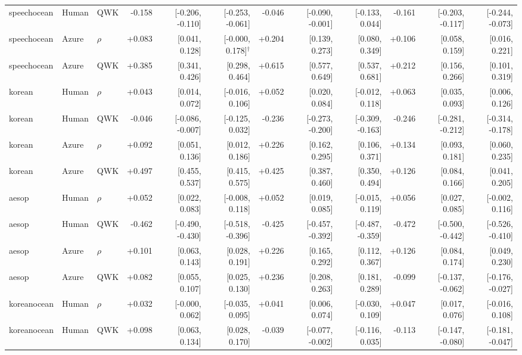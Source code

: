 \begin{landscape}
\begin{longtable}{@{}lllrrrrrrrrr@{}}
speechocean & Human & QWK & -0.158 & [-0.206, -0.110] & [-0.253, -0.061] & -0.046 & [-0.090, -0.001] & [-0.133, 0.044] & -0.161 & [-0.203, -0.117] & [-0.244, -0.073]\\
speechocean & Azure & $\rho$ & +0.083 & [0.041, 0.128] & [-0.000, 0.178]$^{\dagger}$ & +0.204 & [0.139, 0.273] & [0.080, 0.349] & +0.106 & [0.058, 0.159] & [0.016, 0.221]\\
speechocean & Azure & QWK & +0.385 & [0.341, 0.426] & [0.298, 0.464] & +0.615 & [0.577, 0.649] & [0.537, 0.681] & +0.212 & [0.156, 0.266] & [0.101, 0.319]\\
\addlinespace[2pt]
korean & Human & $\rho$ & +0.043 & [0.014, 0.072] & [-0.016, 0.106] & +0.052 & [0.020, 0.084] & [-0.012, 0.118] & +0.063 & [0.035, 0.093] & [0.006, 0.126]\\
korean & Human & QWK & -0.046 & [-0.086, -0.007] & [-0.125, 0.032] & -0.236 & [-0.273, -0.200] & [-0.309, -0.163] & -0.246 & [-0.281, -0.212] & [-0.314, -0.178]\\
korean & Azure & $\rho$ & +0.092 & [0.051, 0.136] & [0.012, 0.186] & +0.226 & [0.162, 0.295] & [0.106, 0.371] & +0.134 & [0.093, 0.181] & [0.060, 0.235]\\
korean & Azure & QWK & +0.497 & [0.455, 0.537] & [0.415, 0.575] & +0.425 & [0.387, 0.460] & [0.350, 0.494] & +0.126 & [0.084, 0.166] & [0.041, 0.205]\\
\addlinespace[2pt]
aesop & Human & $\rho$ & +0.052 & [0.022, 0.083] & [-0.008, 0.118] & +0.052 & [0.019, 0.085] & [-0.015, 0.119] & +0.056 & [0.027, 0.085] & [-0.002, 0.116]\\
aesop & Human & QWK & -0.462 & [-0.490, -0.430] & [-0.518, -0.396] & -0.425 & [-0.457, -0.392] & [-0.487, -0.359] & -0.472 & [-0.500, -0.442] & [-0.526, -0.410]\\
aesop & Azure & $\rho$ & +0.101 & [0.063, 0.143] & [0.028, 0.191] & +0.226 & [0.165, 0.292] & [0.112, 0.367] & +0.126 & [0.084, 0.174] & [0.049, 0.230]\\
aesop & Azure & QWK & +0.082 & [0.055, 0.107] & [0.025, 0.130] & +0.236 & [0.208, 0.263] & [0.181, 0.289] & -0.099 & [-0.137, -0.062] & [-0.176, -0.027]\\
\addlinespace[2pt]
koreanocean & Human & $\rho$ & +0.032 & [-0.000, 0.062] & [-0.035, 0.095] & +0.041 & [0.006, 0.074] & [-0.030, 0.109] & +0.047 & [0.017, 0.076] & [-0.016, 0.108]\\
koreanocean & Human & QWK & +0.098 & [0.063, 0.134] & [0.028, 0.170] & -0.039 & [-0.077, -0.002] & [-0.116, 0.035] & -0.113 & [-0.147, -0.080] & [-0.181, -0.047]\\

\end{longtable}
\end{landscape}

